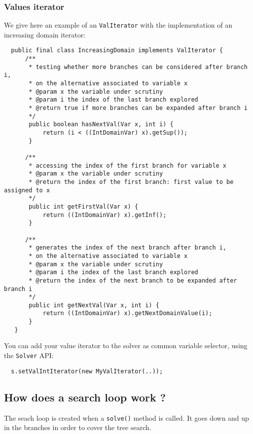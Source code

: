 \subsubsection{Values iterator}\label{advanced:valuesiterator}\hypertarget{advanced:valuesiterator}{}
We give here an example of an \texttt{ValIterator} with the implementation of an increasing domain iterator:
\begin{lstlisting}
  public final class IncreasingDomain implements ValIterator {
	  /**
	   * testing whether more branches can be considered after branch i, 
       * on the alternative associated to variable x
	   * @param x the variable under scrutiny
	   * @param i the index of the last branch explored
	   * @return true if more branches can be expanded after branch i
	   */
       public boolean hasNextVal(Var x, int i) {
           return (i < ((IntDomainVar) x).getSup());
       }
	
	  /**
	   * accessing the index of the first branch for variable x
	   * @param x the variable under scrutiny
	   * @return the index of the first branch: first value to be assigned to x
	   */
       public int getFirstVal(Var x) {
           return ((IntDomainVar) x).getInf();
       }
	
	  /**
	   * generates the index of the next branch after branch i, 
       * on the alternative associated to variable x
	   * @param x the variable under scrutiny
	   * @param i the index of the last branch explored
	   * @return the index of the next branch to be expanded after branch i
	   */
       public int getNextVal(Var x, int i) {
           return ((IntDomainVar) x).getNextDomainValue(i);
       }
   }
\end{lstlisting}

You can add your value iterator to the solver as common variable selector, using the \texttt{Solver} API:
\begin{lstlisting}
  s.setValIntIterator(new MyValIterator(..));
\end{lstlisting}

\subsection{How does a search loop work ?}\label{advanced:howdoesasearchloopwork}\hypertarget{advanced:howdoesasearchloopwork}{}
The seach loop is created when a \texttt{solve()} method is called. It goes down and up in the branches in order to cover the tree search. 

